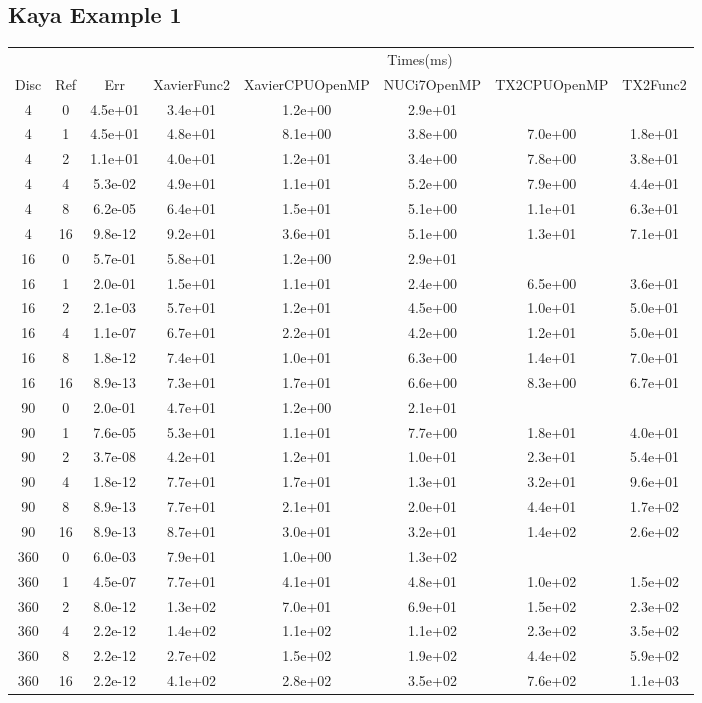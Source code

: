 \begin{landscape}
\subsection{Kaya Example 1}
\begin{center}
\begin{tabular}{c|c|c|c|c|c|c|c}
	&&&\multicolumn{5}{c}{Times(ms)}\\
	Disc&Ref&Err&XavierFunc2&XavierCPUOpenMP&NUCi7OpenMP&TX2CPUOpenMP&TX2Func2\\
\hline
4&0&4.5e+01&3.4e+01&1.2e+00&2.9e+01\\
4&1&4.5e+01&4.8e+01&8.1e+00&3.8e+00&7.0e+00&1.8e+01\\
4&2&1.1e+01&4.0e+01&1.2e+01&3.4e+00&7.8e+00&3.8e+01\\
4&4&5.3e-02&4.9e+01&1.1e+01&5.2e+00&7.9e+00&4.4e+01\\
4&8&6.2e-05&6.4e+01&1.5e+01&5.1e+00&1.1e+01&6.3e+01\\
4&16&9.8e-12&9.2e+01&3.6e+01&5.1e+00&1.3e+01&7.1e+01\\
\hline
16&0&5.7e-01&5.8e+01&1.2e+00&2.9e+01\\
16&1&2.0e-01&1.5e+01&1.1e+01&2.4e+00&6.5e+00&3.6e+01\\
16&2&2.1e-03&5.7e+01&1.2e+01&4.5e+00&1.0e+01&5.0e+01\\
16&4&1.1e-07&6.7e+01&2.2e+01&4.2e+00&1.2e+01&5.0e+01\\
16&8&1.8e-12&7.4e+01&1.0e+01&6.3e+00&1.4e+01&7.0e+01\\
16&16&8.9e-13&7.3e+01&1.7e+01&6.6e+00&8.3e+00&6.7e+01\\
\hline
90&0&2.0e-01&4.7e+01&1.2e+00&2.1e+01\\
90&1&7.6e-05&5.3e+01&1.1e+01&7.7e+00&1.8e+01&4.0e+01\\
90&2&3.7e-08&4.2e+01&1.2e+01&1.0e+01&2.3e+01&5.4e+01\\
90&4&1.8e-12&7.7e+01&1.7e+01&1.3e+01&3.2e+01&9.6e+01\\
90&8&8.9e-13&7.7e+01&2.1e+01&2.0e+01&4.4e+01&1.7e+02\\
90&16&8.9e-13&8.7e+01&3.0e+01&3.2e+01&1.4e+02&2.6e+02\\
\hline
360&0&6.0e-03&7.9e+01&1.0e+00&1.3e+02\\
360&1&4.5e-07&7.7e+01&4.1e+01&4.8e+01&1.0e+02&1.5e+02\\
360&2&8.0e-12&1.3e+02&7.0e+01&6.9e+01&1.5e+02&2.3e+02\\
360&4&2.2e-12&1.4e+02&1.1e+02&1.1e+02&2.3e+02&3.5e+02\\
360&8&2.2e-12&2.7e+02&1.5e+02&1.9e+02&4.4e+02&5.9e+02\\
360&16&2.2e-12&4.1e+02&2.8e+02&3.5e+02&7.6e+02&1.1e+03\\
\hline
\end{tabular}
\end{center}
\end{landscape}







